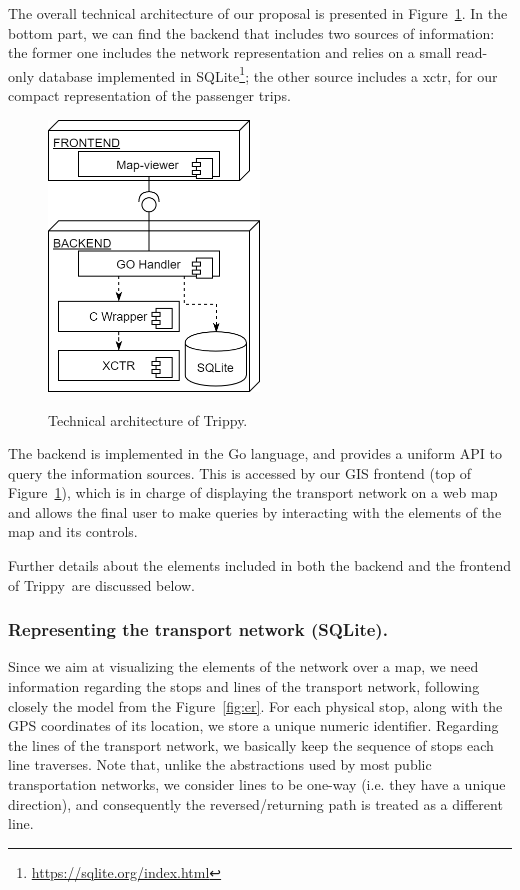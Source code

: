     The overall technical architecture of our proposal is presented in Figure~\ref{fig:arch:real}. In the bottom part, we can find the backend
    that includes two sources of information: the former one includes the network representation and relies on a small read-only database implemented in SQLite\footnote{\url{https://sqlite.org/index.html}}; the other source includes a \gls{xctr}, for our compact representation of the passenger trips.
	
	\begin{figure}[ht]
		\begin{center}
			{\includegraphics[width=0.5\textwidth]{figures/tview.png}}
		\end{center}
		\caption{Technical architecture of Trippy.}
		\label{fig:arch:real}
	\end{figure}
	
	The backend is implemented in the Go language, and provides a uniform API to query the information sources. This is accessed by our GIS frontend (top of Figure~\ref{fig:arch:real}), which is in charge of displaying the transport network on a web map and allows the final user to make queries by interacting with the elements of the map and its controls.

    Further details about the elements included in both the backend and the frontend of Trippy\ are discussed below.
    
    \subsubsection{\bf Representing the transport network (SQLite).}
    Since we aim at visualizing the elements of the network over a map, we need information regarding the stops and lines of the transport network, following closely the model from the Figure~\ref{fig:er}. For each physical stop, along with the GPS coordinates of its location, we store a unique numeric identifier. Regarding the lines of the transport network, we basically keep the sequence of stops each line traverses. Note that, unlike the abstractions used by most public transportation networks, we consider lines to be one-way (i.e. they have a unique direction), and consequently the reversed/returning path is treated as a different line.
    
